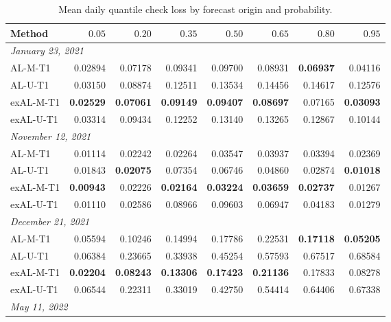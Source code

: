\begin{table}[!htbp]
\centering
\begin{threeparttable}
\caption{Mean daily quantile check loss by forecast origin and probability.}
\label{tab:quantile_check_loss}
\setlength{\tabcolsep}{4pt}
\begin{tabular}{lrrrrrrr}
\hline
Method & $0.05$ & $0.20$ & $0.35$ & $0.50$ & $0.65$ & $0.80$ & $0.95$ \\
\hline
\multicolumn{8}{l}{\textit{January 23, 2021}} \\
AL-M-T1 & 0.02894 & 0.07178 & 0.09341 & 0.09700 & 0.08931 & \textbf{0.06937} & 0.04116 \\
AL-U-T1 & 0.03150 & 0.08874 & 0.12511 & 0.13534 & 0.14456 & 0.14617 & 0.12576 \\
exAL-M-T1 & \textbf{0.02529} & \textbf{0.07061} & \textbf{0.09149} & \textbf{0.09407} & \textbf{0.08697} & 0.07165 & \textbf{0.03093} \\
exAL-U-T1 & 0.03314 & 0.09434 & 0.12252 & 0.13140 & 0.13265 & 0.12867 & 0.10144 \\
\multicolumn{8}{l}{\textit{November 12, 2021}} \\
AL-M-T1 & 0.01114 & 0.02242 & 0.02264 & 0.03547 & 0.03937 & 0.03394 & 0.02369 \\
AL-U-T1 & 0.01843 & \textbf{0.02075} & 0.07354 & 0.06746 & 0.04860 & 0.02874 & \textbf{0.01018} \\
exAL-M-T1 & \textbf{0.00943} & 0.02226 & \textbf{0.02164} & \textbf{0.03224} & \textbf{0.03659} & \textbf{0.02737} & 0.01267 \\
exAL-U-T1 & 0.01110 & 0.02586 & 0.08966 & 0.09603 & 0.06947 & 0.04183 & 0.01279 \\
\multicolumn{8}{l}{\textit{December 21, 2021}} \\
AL-M-T1 & 0.05594 & 0.10246 & 0.14994 & 0.17786 & 0.22531 & \textbf{0.17118} & \textbf{0.05205} \\
AL-U-T1 & 0.06384 & 0.23665 & 0.33938 & 0.45254 & 0.57593 & 0.67517 & 0.68584 \\
exAL-M-T1 & \textbf{0.02204} & \textbf{0.08243} & \textbf{0.13306} & \textbf{0.17423} & \textbf{0.21136} & 0.17833 & 0.08278 \\
exAL-U-T1 & 0.06544 & 0.22311 & 0.33019 & 0.42750 & 0.54414 & 0.64406 & 0.67338 \\
\multicolumn{8}{l}{\textit{May 11, 2022}} \\

\end{tabular}
\end{threeparttable}
\end{table}
